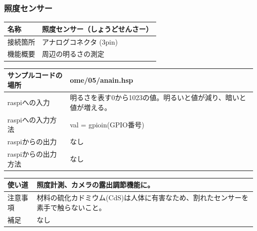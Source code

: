 \subsubsection{照度センサー}\label{light}
\begin{table}[H]
	\begin{tabular}{|p{\colF}|p{\colG}|}	\hline
	名称 & 照度センサー（しょうどせんさー）\\ \hline
	接続箇所 & アナログコネクタ (3pin)\\ \hline
	機能概要 & 周辺の明るさの測定\\ \hline
  \end{tabular}
\end{table}

\begin{table}[H]
	\begin{tabular}{|p{\colF}|p{\colG}|}	\hline
	サンプルコードの場所 & ome/05/anain.hsp\\ \hline
	raspiへの入力 & 明るさを表す0から1023の値。明るいと値が減り、暗いと値が増える。\\ \hline
	raspiへの入力方法 & val = gpioin(GPIO番号)\\ \hline
	raspiからの出力 & なし\\ \hline
	raspiからの出力方法 & なし\\ \hline
  \end{tabular}
\end{table}

\begin{table}[H]
	\begin{tabular}{|p{\colF}|p{\colG}|} \hline
	使い道 & 照度計測、カメラの露出調節機能に。\\ \hline
	注意事項 & 材料の硫化カドミウム(CdS)は人体に有害なため、割れたセンサーを素手で触らないこと。\\ \hline
	補足 & なし\\ \hline
  \end{tabular}
\end{table}

